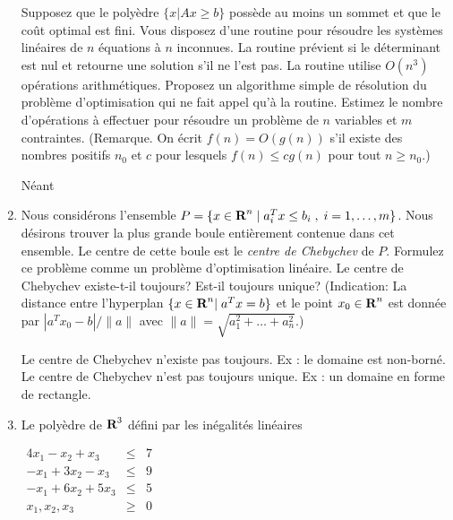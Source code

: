 \begin{enumerate}
    Supposez que le poly\`edre $\{x |  Ax \geq b \}$  possède au moins un sommet et que le coût optimal est fini. Vous disposez d'une routine pour résoudre les
    systèmes linéaires de $n$ équations à $n$ inconnues. La routine prévient si le déterminant est nul et retourne une solution s'il ne l'est pas. La routine
    utilise
    $O(n^3)$ opérations arithmétiques.  Proposez un algorithme
    simple de résolution du problème d'optimisation qui ne fait appel qu'à la routine. Estimez le nombre d'opérations à effectuer pour résoudre un
    problème de
    $n$ variables et $m$ contraintes. (Remarque. On écrit $f(n)=O(g(n))$ s'il existe des nombres positifs $n_0$ et $c$ pour lesquels $f(n) \leq cg(n)$ pour tout
    $n \geq n_0$.)








    \begin{solution}
      Néant
    \end{solution}

  \item Nous considérons l'ensemble $P=\{ x \in {\mbox{\bf R}}^n \; | \; a_i^T x \leq b_i \; , \;  i=1, \ldots, m \}$. Nous désirons trouver la
    plus grande boule entièrement contenue dans cet ensemble. Le centre de cette boule est  le {\it centre de Chebychev} de $P$.  Formulez
    ce problème comme un problème d'optimisation linéaire. Le centre de Chebychev
    existe-t-il toujours? Est-il toujours unique? (Indication:  La distance entre l'hyperplan $\{x \in {\mbox{\bf R}}^n | \;  a^Tx=b \}$ et le point $x_0 \in {\mbox{\bf R}}^n$
    est donnée par
    $|a^Tx_0 - b|/\|a\|$ avec $\|a\|=\sqrt{a_1^2+ \ldots + a_n^2}$.)



    \begin{solution}
      Le centre de Chebychev n'existe pas toujours. Ex : le domaine est non-borné. Le centre de Chebychev n'est pas toujours unique. Ex : un domaine en forme de rectangle.
    \end{solution}

  \item  Le poly\`edre de ${\mbox{\bf R}}^3$ défini par les inégalités linéaires

    $
    \begin{array}{rcr}
      4x_1- x_2 +x_3 & \leq & 7\\
      -x_1 +3x_2 -x_3 & \leq & 9\\
      -x_1 + 6 x_2 +5 x_3 & \leq & 5\\
      x_1, x_2, x_3 & \geq & 0
    \end{array}
    $


\end{enumerate}
